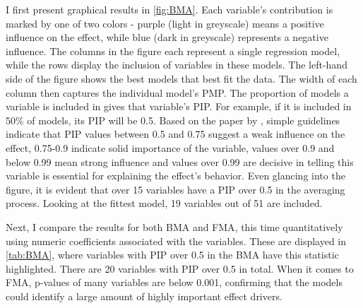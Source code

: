 I first present graphical results in \autoref{fig:BMA}. Each variable's contribution is marked by one of two colors - purple (light in greyscale)   means a positive influence on the effect, while blue (dark in greyscale) represents a negative influence. The columns in the figure each represent a single regression model, while the rows display the inclusion of variables in these models. The left-hand side of the figure shows the best models that best fit the data. The width of each column then captures the individual model's \ac{PMP}. The proportion of models a variable is included in gives that variable's \ac{PIP}. For example, if it is included in 50\% of models, its \ac{PIP} will be 0.5. Based on the paper by \cite{kass1995bayes}, simple guidelines indicate that \ac{PIP} values between 0.5 and 0.75 suggest a weak influence on the effect, 0.75-0.9 indicate solid importance of the variable, values over 0.9 and below 0.99 mean strong influence and values over 0.99 are decisive in telling this variable is essential for explaining the effect's behavior. Even glancing into the figure, it is evident that over 15 variables have a \ac{PIP} over 0.5 in the averaging process. Looking at the fittest model, 19 variables out of 51 are included.

Next, I compare the results for both \ac{BMA} and \ac{FMA}, this time quantitatively using numeric coefficients associated with the variables. These are displayed in \autoref{tab:BMA}, where variables with \ac{PIP} over 0.5 in the \ac{BMA} have this statistic highlighted. There are 20 variables with \ac{PIP} over 0.5 in total. When it comes to \ac{FMA}, p-values of many variables are below 0.001, confirming that the models could identify a large amount of highly important effect drivers.

